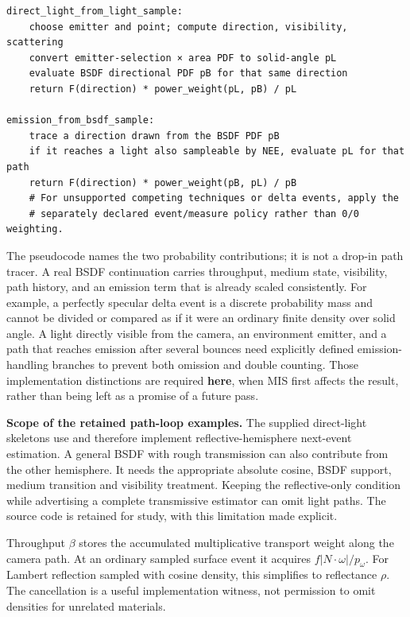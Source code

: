 \begin{verbatim}
direct_light_from_light_sample:
    choose emitter and point; compute direction, visibility, scattering
    convert emitter-selection × area PDF to solid-angle pL
    evaluate BSDF directional PDF pB for that same direction
    return F(direction) * power_weight(pL, pB) / pL

emission_from_bsdf_sample:
    trace a direction drawn from the BSDF PDF pB
    if it reaches a light also sampleable by NEE, evaluate pL for that path
    return F(direction) * power_weight(pB, pL) / pB
    # For unsupported competing techniques or delta events, apply the
    # separately declared event/measure policy rather than 0/0 weighting.
\end{verbatim}

The pseudocode names the two probability contributions; it is not a drop-in path tracer. A real BSDF continuation carries throughput, medium state, visibility, path history, and an emission term that is already scaled consistently. For example, a perfectly specular delta event is a discrete probability mass and cannot be divided or compared as if it were an ordinary finite density over solid angle. A light directly visible from the camera, an environment emitter, and a path that reaches emission after several bounces need explicitly defined emission-handling branches to prevent both omission and double counting. Those implementation distinctions are required \textbf{here}, when MIS first affects the result, rather than being left as a promise of a future pass.

\textbf{Scope of the retained path-loop examples.} The supplied direct-light skeletons use  and therefore implement reflective-hemisphere next-event estimation. A general BSDF with rough transmission can also contribute from the other hemisphere. It needs the appropriate absolute cosine, BSDF support, medium transition and visibility treatment. Keeping the reflective-only condition while advertising a complete transmissive estimator can omit light paths. The source code is retained for study, with this limitation made explicit.

Throughput \(\beta\) stores the accumulated multiplicative transport weight along the camera path. At an ordinary sampled surface event it acquires \(f\lvert N\cdot\omega\rvert/p_\omega\). For Lambert reflection sampled with cosine density, this simplifies to reflectance \(\rho\). The cancellation is a useful implementation witness, not permission to omit densities for unrelated materials.

